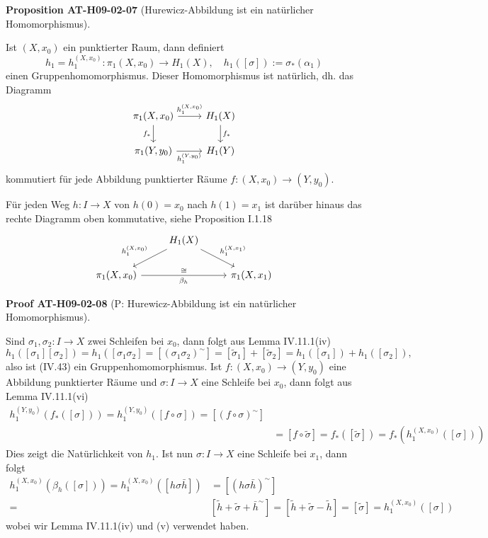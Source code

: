 \documentclass[10pt, letterpaper]{article}
\newcommand{\CustomHeading}[3]{%
  \par\medskip\noindent%
  \textbf{#1 #2} \textnormal{(#3)}.\enskip%
}
\newenvironment{PROP}[2]{\CustomHeading{Proposition}{#1}{#2}}{}
\newenvironment{PROOF}[2]{\CustomHeading{Proof}{#1}{#2}}{}
\begin{document}
\begin{PROP}{AT-H09-02-07}{Hurewicz-Abbildung ist ein natürlicher Homomorphismus}
Ist $(X, x_0)$ ein punktierter Raum, dann definiert 
$$h_1=h_1^{\left(X, x_0\right)}: \pi_1\left(X, x_0\right) \rightarrow H_1(X), \quad h_1([\sigma]):=\sigma_*\left(\alpha_1\right)$$
einen Gruppenhomomorphismus. Dieser Homomorphismus ist natürlich, dh. das Diagramm
\[
\begin{tikzcd}
\pi_1(X, x_0) \arrow[r, "h_1^{(X,x_0)}"] \arrow[d, "f_*"'] & H_1(X) \arrow[d, "f_*"] \\
\pi_1(Y, y_0) \arrow[r, "h_1^{(Y,y_0)}"'] & H_1(Y)
\end{tikzcd}
\]
kommutiert für jede Abbildung punktierter Räume $f:\left(X, x_0\right) \rightarrow\left(Y, y_0\right)$. 

Für jeden Weg $h: I \rightarrow X$ von $h(0)=x_0$ nach $h(1)=x_1$ ist darüber hinaus das rechte Diagramm oben kommutative, siehe Proposition I.1.18
\[
\begin{tikzcd}
  & H_1(X) \arrow[dl, "h_1^{(X,x_0)}"'] \arrow[dr, "h_1^{(X,x_1)}"] \\
  \pi_1(X, x_0) \arrow[rr, "\beta_h"', "\cong"{above}] & & \pi_1(X, x_1)
\end{tikzcd}
\]
\end{PROP}

\begin{PROOF}{AT-H09-02-08}{P: Hurewicz-Abbildung ist ein natürlicher Homomorphismus}
Sind $\sigma_1, \sigma_2: I \rightarrow X$ zwei Schleifen bei $x_0$, dann folgt aus Lemma IV.11.1(iv)
$$
h_1\left(\left[\sigma_1\right]\left[\sigma_2\right]\right)=h_1\left(\left[\sigma_1 \sigma_2\right]=\left[\left(\sigma_1 \sigma_2\right)^{\sim}\right]=\left[\tilde{\sigma}_1\right]+\left[\tilde{\sigma}_2\right]=h_1\left(\left[\sigma_1\right]\right)+h_1\left(\left[\sigma_2\right]\right),\right.
$$
also ist (IV.43) ein Gruppenhomomorphismus. Ist $f:\left(X, x_0\right) \rightarrow\left(Y, y_0\right)$ eine Abbildung punktierter Räume und $\sigma: I \rightarrow X$ eine Schleife bei $x_0$, dann folgt aus Lemma IV.11.1(vi)
$$
\begin{aligned}
h_1^{\left(Y, y_0\right)}\left(f_*([\sigma])\right)=h_1^{\left(Y, y_0\right)}([f \circ \sigma])=\left[(f \circ \sigma)^{\sim}\right] & \\
& =[f \circ \tilde{\sigma}]=f_*([\tilde{\sigma}])=f_*\left(h_1^{\left(X, x_0\right)}([\sigma])\right)
\end{aligned}
$$
Dies zeigt die Natürlichkeit von $h_1$. Ist nun $\sigma: I \rightarrow X$ eine Schleife bei $x_1$, dann folgt
$$
\begin{aligned}
h_1^{\left(X, x_0\right)}\left(\beta_h([\sigma])\right)=h_1^{\left(X, x_0\right)}([h \sigma \bar{h}]) & =\left[(h \sigma \bar{h})^{\sim}\right] \\
= & {\left[\tilde{h}+\tilde{\sigma}+\bar{h}^{\sim}\right]=[\tilde{h}+\tilde{\sigma}-\tilde{h}]=[\tilde{\sigma}]=h_1^{\left(X, x_0\right)}([\sigma]) }
\end{aligned}
$$
wobei wir Lemma IV.11.1(iv) und (v) verwendet haben.
\end{PROOF}
\end{document}
